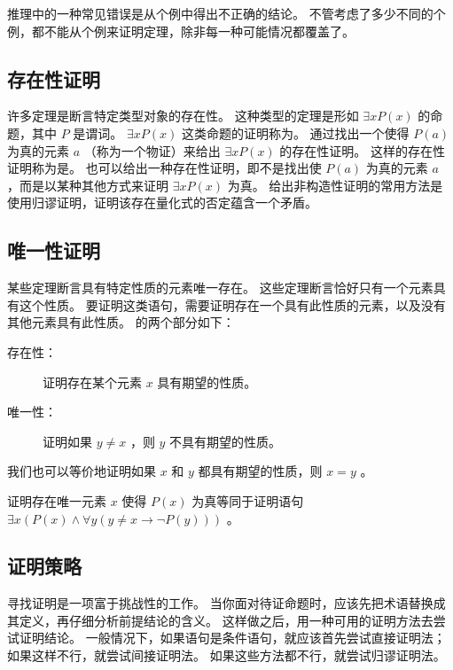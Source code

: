 {{        
        {
            推理中的一种常见错误是从个例中得出不正确的结论。
            不管考虑了多少不同的个例，都不能从个例来证明定理，除非每一种可能情况都覆盖了。
        }
    }

    \subsection{存在性证明}
    {
        许多定理是断言特定类型对象的存在性。
        这种类型的定理是形如 $\exists x P(x)$ 的命题，其中 $P$ 是谓词。
        $\exists x P(x)$ 这类命题的证明称为。
        通过找出一个使得 $P(a)$ 为真的元素 $a$ （称为一个物证）来给出 $\exists x P(x)$ 的存在性证明。
        这样的存在性证明称为是。
        也可以给出一种存在性证明，即不是找出使 $P(a)$ 为真的元素 $a$ ，而是以某种其他方式来证明 $\exists x P(x)$ 为真。
        给出非构造性证明的常用方法是使用归谬证明，证明该存在量化式的否定蕴含一个矛盾。
    }

    \subsection{唯一性证明}
    {
        某些定理断言具有特定性质的元素唯一存在。
        这些定理断言恰好只有一个元素具有这个性质。
        要证明这类语句，需要证明存在一个具有此性质的元素，以及没有其他元素具有此性质。
        的两个部分如下：

        \begin{description}
            \item[存在性：] 证明存在某个元素 $x$ 具有期望的性质。
            \item[唯一性：] 证明如果 $y \neq x$ ，则 $y$ 不具有期望的性质。
        \end{description}

        我们也可以等价地证明如果 $x$ 和 $y$ 都具有期望的性质，则 $x = y$ 。

        \begin{defines}
            证明存在唯一元素 $x$ 使得 $P(x)$ 为真等同于证明语句 $\exists x (P(x) \wedge \forall y (y \neq x \rightarrow \neg P(y)))$ 。
        \end{defines}
    }

    \subsection{证明策略}
    {
        寻找证明是一项富于挑战性的工作。
        当你面对待证命题时，应该先把术语替换成其定义，再仔细分析前提结论的含义。
        这样做之后，用一种可用的证明方法去尝试证明结论。
        一般情况下，如果语句是条件语句，就应该首先尝试直接证明法；
        如果这样不行，就尝试间接证明法。
        如果这些方法都不行，就尝试归谬证明法。

}}

